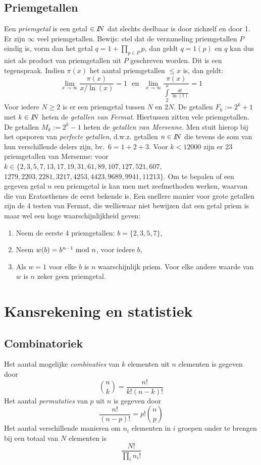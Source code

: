\documentclass[twoside]{report}
\begin{document}
\section{Priemgetallen}
Een {\it priemgetal} is een getal $\in I\hspace{-1mm}N$ dat slechts deelbaar is door
zichzelf en door 1. Er zijn $\infty$ veel priemgetallen. Bewijs: stel dat
de verzameling priemgetallen $P$ eindig is, vorm dan het getal
$q=1+\prod\limits_{p\in P}p$, dan geldt $q=1(p)$ en $q$ kan dus niet als
product van priemgetallen uit $P$ geschreven worden. Dit is een tegenspraak.
\npar
Indien $\pi(x)$ het aantal priemgetallen $\leq x$ is, dan geldt:
\[
\lim_{x\rightarrow\infty}\frac{\pi(x)}{x/\ln(x)}=1~~~\mbox{en}~~~
\lim_{x\rightarrow\infty}\frac{\pi(x)}{\int\limits_2^x\frac{dt}{\ln(t)}}=1
\]
Voor iedere $N\geq2$ is er een priemgetal tussen $N$ en $2N$.
\npar
De getallen $F_k:=2^k+1$ met $k\in I\hspace{-1mm}N$ heten de {\it getallen van Fermat}.
Hiertussen zitten vele priemgetallen.
\npar
De getallen $M_k:=2^k-1$ heten de {\it getallen van Mersenne}. Men stuit hierop
bij het opsporen van {\it perfecte getallen}, d.w.z. getallen $n\in I\hspace{-1mm}N$ die
tevens de som van hun verschillende delers zijn, bv.\ $6=1+2+3$. Voor $k<12000$
zijn er 23 priemgetallen van Mersenne: voor $k\in\{2,3,5,7,13,17,19,31,61,89,
107,127,521,607,$ $1279,2203,2281,3217,4253,4423,9689,9941,11213\}$.
\npar
Om te bepalen of een gegeven getal $n$ een priemgetal is kan men met
zeefmethoden werken, waarvan die van Eratosthenes de eerst bekende is. Een
snellere manier voor grote getallen zijn de 4 testen van Fermat, die welliswaar
niet bewijzen dat een getal priem is maar wel een hoge waarschijnlijkheid geven:
\begin{enumerate}
\item Neem de eerste 4 priemgetallen: $b=\{2,3,5,7\}$,
\item Neem $w(b)=b^{n-1}~{\rm mod}~n$, voor iedere $b$,
\item Als $w=1$ voor elke $b$ is $n$ waarschijnlijk priem. Voor elke andere
      waarde van $w$ is $n$ zeker geen priemgetal.
\end{enumerate}


\chapter{Kansrekening en statistiek}
\section{Combinatoriek}
Het aantal mogelijke {\it combinaties} van $k$ elementen uit $n$ elementen is
gegeven door
\[
{n\choose k}=\frac{n!}{k!(n-k)!}
\]
Het aantal {\it permutaties} van $p$ uit $n$ is gegeven door
\[
\frac{n!}{(n-p)!}=p!{n\choose p}
\]
Het aantal verschillende manieren om $n_i$ elementen in $i$ groepen onder te
brengen bij een totaal van $N$ elementen is
\[
\frac{N!}{\prod\limits_i n_i!}
\]
\end{document}
